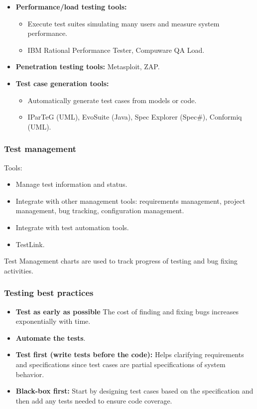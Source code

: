 \documentclass[../ESOF_notes.tex]{subfiles}
\begin{document}
\begin{itemize}
\begin{itemize}
          \end{itemize}
    \item \textbf{Performance/load testing tools:}
          \begin{itemize}
              \item Execute test suites simulating many users
                    and measure system performance.
              \item IBM Rational Performance Tester, Compuware QA Load.
          \end{itemize}
    \item \textbf{Penetration testing tools:} Metasploit, ZAP.
    \item \textbf{Test case generation tools:}
          \begin{itemize}
              \item Automatically generate test cases from
                    models or code.
              \item IParTeG (UML), EvoSuite (Java), Spec Explorer (Spec\#),
                    Conformiq (UML).
          \end{itemize}
\end{itemize}
\subsubsection{Test management}

Tools:
\begin{itemize}
    \item Manage test information and status.
    \item Integrate with other management tools:
          requirements management, project management, 
          bug tracking, configuration management.
    \item Integrate with test automation tools.
    \item TestLink.
\end{itemize}

Test Management charts are used to track progress 
of testing and bug fixing activities.

\subsubsection{Testing best practices}
\begin{itemize}
    \item \textbf{Test as early as possible} The cost of finding
          and fixing bugs increases exponentially with time.
    \item \textbf{Automate the tests}.
    \item \textbf{Test first (write tests before the code):}
          Helps clarifying requirements and specifications since
          test cases are partial specifications of system behavior.
    \item \textbf{Black-box first:} Start by designing test
          cases based on the specification and then add any tests 
          needed to ensure code coverage.
\end{itemize}
\pagebreak
\end{document}
